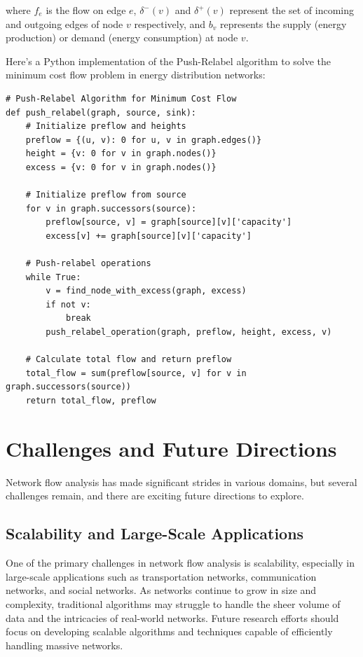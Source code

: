 \documentclass[12pt]{book} %
\begin{document}
where \(f_e\) is the flow on edge \(e\), \(\delta^-(v)\) and \(\delta^+(v)\) represent the set of incoming and outgoing edges of node \(v\) respectively, and \(b_v\) represents the supply (energy production) or demand (energy consumption) at node \(v\).

Here's a Python implementation of the Push-Relabel algorithm to solve the minimum cost flow problem in energy distribution networks:
\FloatBarrier
\begin{lstlisting}
# Push-Relabel Algorithm for Minimum Cost Flow
def push_relabel(graph, source, sink):
    # Initialize preflow and heights
    preflow = {(u, v): 0 for u, v in graph.edges()}
    height = {v: 0 for v in graph.nodes()}
    excess = {v: 0 for v in graph.nodes()}
    
    # Initialize preflow from source
    for v in graph.successors(source):
        preflow[source, v] = graph[source][v]['capacity']
        excess[v] += graph[source][v]['capacity']
    
    # Push-relabel operations
    while True:
        v = find_node_with_excess(graph, excess)
        if not v:
            break
        push_relabel_operation(graph, preflow, height, excess, v)
    
    # Calculate total flow and return preflow
    total_flow = sum(preflow[source, v] for v in graph.successors(source))
    return total_flow, preflow
\end{lstlisting}
\FloatBarrier

\section{Challenges and Future Directions}
Network flow analysis has made significant strides in various domains, but several challenges remain, and there are exciting future directions to explore.

\subsection{Scalability and Large-Scale Applications}
One of the primary challenges in network flow analysis is scalability, especially in large-scale applications such as transportation networks, communication networks, and social networks. As networks continue to grow in size and complexity, traditional algorithms may struggle to handle the sheer volume of data and the intricacies of real-world networks. Future research efforts should focus on developing scalable algorithms and techniques capable of efficiently handling massive networks.
\end{document}
